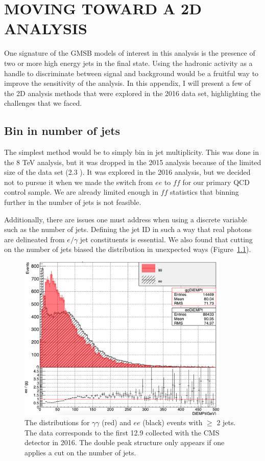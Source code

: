 \chapter{MOVING TOWARD A 2D ANALYSIS}
\label{app:2D}

One signature of the GMSB models of interest in this analysis
is the presence of two or more high energy jets in the final state.
Using the hadronic activity as a handle to discriminate between signal and background
would be a fruitful way to improve the sensitivity of the analysis. 
In this appendix, I will present a few of the 2D analysis methods
that were explored in the 2016 data set, highlighting the challenges 
that we faced. 

\section{Bin in number of jets}
The simplest method would be to simply bin in jet multiplicity.
This was done in the 8 TeV analysis, but it was dropped in the 
2015 analysis because of the limited size of the data set (2.3 \fbinv).
It was explored in the 2016 analysis, but we decided not 
to pursue it when we made the switch from $ee$ to $ff$ for our 
primary QCD control sample. We are 
already limited enough in $ff$ statistics that binning further 
in the number of jets is not feasible. 

Additionally, there are issues one must address when using 
a discrete variable such as the number of jets. Defining the 
jet ID in such a way that real photons are delineated from 
$e/\gamma$ jet constituents is essential. We also found
that cutting on the number of jets biased the \diempt distribution
in unexpected ways (Figure~\ref{fig:weirdDiempt}).

\begin{figure}[h]
\begin{center}
\includegraphics[width=0.9\textwidth]{Figures/Appendix/weirdDiempt.png}
\end{center}
\caption{The \diempt distributions for $\gamma\gamma$ (red) and $ee$ (black)
events with $\geq$ 2 jets. The data corresponds to the first 12.9 \fbinv collected 
with the CMS detector in 2016. The double peak structure only appears if one 
applies a cut on the number of jets. }
\label{fig:weirdDiempt}
\end{figure}

